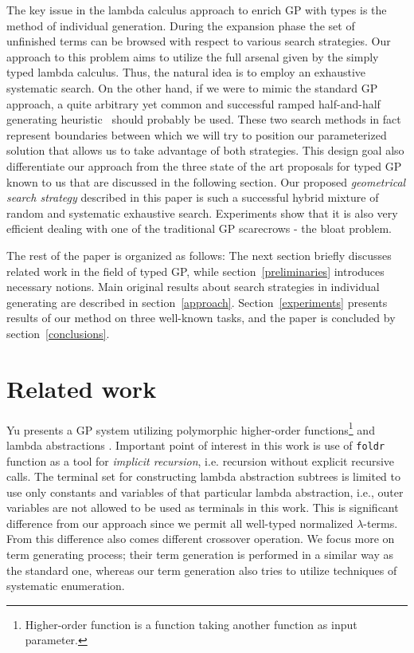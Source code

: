 \documentclass{sig-alternate}
\newcommand{\lterms}{$\lambda$-terms\xspace}
\begin{document}
The key issue in the lambda calculus approach to enrich GP with types is the method of individual generation. During the expansion phase the set of unfinished terms can be browsed with respect to various search strategies. Our approach to this problem aims to utilize the full arsenal given by the simply typed lambda calculus. Thus, the natural idea is to employ an exhaustive systematic search. On the other hand, if we were to mimic the standard GP approach, a quite arbitrary yet common and successful ramped half-and-half generating heuristic~\cite{fg} should probably be used.  
These two search methods in fact represent boundaries between which we will try to position our parameterized solution that allows us to take advantage of both strategies. This design goal also differentiate our approach from 
the three state of the art proposals for typed GP known to us that are discussed in the following section. 
Our proposed \emph{geometrical search strategy} described in this paper is such a successful hybrid mixture of random and systematic exhaustive search. Experiments show that it is also very efficient dealing with one of the traditional GP scarecrows - the bloat problem.

The rest of the paper is organized as follows: The next section briefly discusses related work in the field of typed GP, while section~\ref{preliminaries} introduces necessary notions. Main original results about search strategies in individual generating are described in section~\ref{approach}. Section~\ref{experiments} presents results of our method on three well-known tasks, and the paper is concluded by section~\ref{conclusions}.


\section{Related work}
\label{related}

Yu presents a GP system utilizing
polymorphic higher-order functions\footnote{Higher-order 
function is a function taking another function as 
input parameter.} and lambda abstractions  \cite{yu01}.
Important point of interest in this work is use of
\texttt{foldr} function as a tool for \textit{implicit recursion},
i.e. recursion without explicit recursive calls. 
The terminal set for constructing lambda abstraction subtrees 
is limited to use only constants and variables of that particular
lambda abstraction, i.e., outer variables are not allowed to be used
as terminals in this work. This is significant difference from our approach 
since we permit all well-typed normalized \lterms. From this difference also
comes different crossover operation. We focus more on term generating process; 
their term generation is performed in a similar way as the standard one, 
whereas our term generation also tries to utilize techniques of systematic enumeration. 
\end{document}
